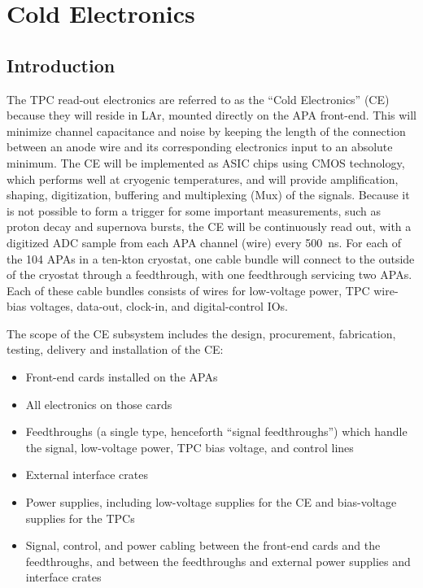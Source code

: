 \chapter{Cold Electronics}
\label{ch:ce}

%
\section{Introduction}
\label{sec:ce_intro}

The TPC read-out electronics are referred to as the ``Cold Electronics'' (CE) because they will reside in LAr,
mounted directly on the APA front-end.
This will minimize channel capacitance and noise by keeping the length of the connection between an anode wire
and its corresponding electronics input to an absolute minimum.
The CE will be implemented as ASIC chips using CMOS technology, which performs well at cryogenic temperatures,
and will provide amplification, shaping, digitization, buffering and multiplexing (Mux) of the signals.
Because it is not possible to form a trigger for some important measurements,
such as proton decay and supernova bursts, the CE will be continuously read out,
with a digitized ADC sample from each APA channel (wire) every 500~ns.
For each of the 104 APAs in a ten-kton cryostat, one cable bundle will connect to the outside of the cryostat through
a feedthrough, with one feedthrough servicing two APAs.
Each of these cable bundles consists of wires for low-voltage power, TPC wire-bias voltages, data-out, clock-in, and
digital-control IOs.

The scope of the CE subsystem includes the design, procurement, fabrication, testing,
delivery and installation of the CE:
\begin{itemize}
\item Front-end cards installed on the APAs
\item All electronics on those cards
\item Feedthroughs (a single type, henceforth ``signal feedthroughs'') which handle the signal,
low-voltage power, TPC bias voltage, and control lines
\item External interface crates
\item Power supplies, including low-voltage supplies for the CE and bias-voltage supplies for the TPCs
\item Signal, control, and power cabling between the front-end cards and the feedthroughs,
and between the feedthroughs and external power supplies and interface crates
\end{itemize}

